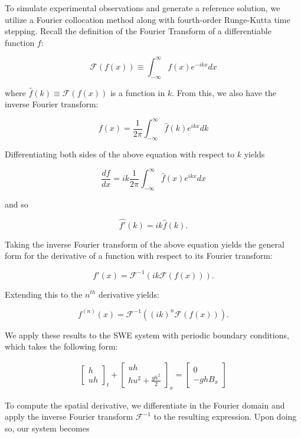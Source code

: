 To simulate experimental observations and generate a reference solution, we utilize a Fourier collocation method along 
with fourth-order Runge-Kutta time stepping. Recall the definition of the Fourier Transform of a differentiable function 
$f$:

$$
\mathcal{F}(f(x)) \equiv \int_{-\infty}^{\infty}f(x)e^{-ikx}dx
$$

where $\hat{f}(k) \equiv \mathcal{F}(f(x))$ is a function in $k$. From this, we also have the inverse Fourier transform:

$$
f(x) = \frac{1}{2\pi}\int_{-\infty}^{\infty} \hat{f}(k)e^{ikx}dk
$$

\noindent Differentiating both sides of the above equation with respect to $k$ yields

$$
\frac{df}{dx} = ik\frac{1}{2\pi}\int_{-\infty}^{\infty}\hat{f}(x)e^{ikx}dx
$$

\noindent and so

$$
\hat{f'}(k) = ik\hat{f}(k).
$$

Taking the inverse Fourier transform of the above equation yields the general form for the derivative of a function with 
respect to its Fourier transform:

$$
f'(x) = \mathcal{F}^{-1}(ik\mathcal{F}(f(x))).
$$

\noindent Extending this to the $n^{th}$ derivative yields:

$$
f^{(n)}(x) = \mathcal{F}^{-1}((ik)^n\mathcal{F}(f(x))).
$$

We apply these results to the SWE system with periodic boundary conditions, which takes the following form:

\begin{align*}
    \begin{bmatrix}
        h\\
        uh
    \end{bmatrix}_t
    + 
    \begin{bmatrix}
        uh\\
        hu^2 + \frac{gh^2}{2}
    \end{bmatrix}_x
    =
    \begin{bmatrix}
        0\\
        -ghB_x
    \end{bmatrix}
\end{align*}    

To compute the spatial derivative, we differentiate in the Fourier domain and apply the inverse Fourier transform 
$\mathcal{F}^{-1}$ to the resulting expression. Upon doing so, our system becomes

